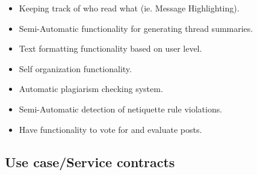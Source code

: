 \documentclass[a4paper,12pt]{report}
\begin{document}
\begin{itemize}
  \item Keeping track of who read what (ie. Message Highlighting).
 	\begin{center}
	\end{center} 
  \item Semi-Automatic functionality for generating thread summaries.
  \item Text formatting functionality based on user level.
  \item Self organization functionality.
  \item Automatic plagiarism checking system.
  \item Semi-Automatic detection of netiquette rule violations.
  \item Have functionality to vote for and evaluate posts.
\begin{center}
	\end{center}	
\end{itemize}
\subsection{Use case/Service contracts}
\end{document}
